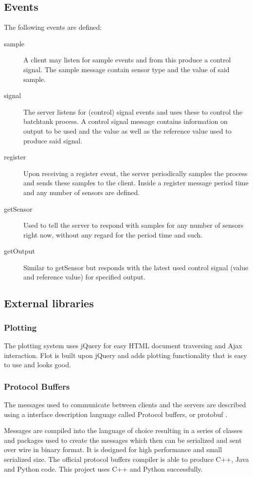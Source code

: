 \documentclass{article}
\begin{document}
\subsection{Events}
The following events are defined:

\begin{description}
\item[sample]
  A client may listen for sample events and from this produce a control
  signal. The sample message contain sensor type and the value of said
  sample.
\item[signal]
  The server listens for (control) signal events and uses these to
  control the batchtank process. A control signal message contains
  information on output to be used and the value as well as the
  reference value used to produce said signal.
\item[register]
  Upon receiving a register event, the server periodically samples the
  process and sends these samples to the client. Inside a register
  message period time and any number of sensors are defined.
\item[getSensor]
  Used to tell the server to respond with samples for any number of
  sensors right now, without any regard for the period time and such.
\item[getOutput]
  Similar to getSensor but responds with the latest used control signal
  (value and reference value) for specified output.
\end{description}

\subsection{External libraries}
\subsubsection{Plotting}
The plotting system uses jQuery \cite{jquery} for easy HTML document
traversing and Ajax interaction. Flot \cite{flot} is built upon jQuery
and adds plotting functionality that is easy to use and looks good.


\subsubsection{Protocol Buffers}
The messages used to communicate between clients and the servers are
described using a interface description language called Protocol
buffers, or protobuf \cite{protobuf}.

Messages are compiled into the language of choice resulting in a series
of classes and packages used to create the messages which then can be
serialized and sent over wire in binary format. It is designed for high
performance and small serialized size. The official protocol buffers
compiler is able to produce C++, Java and Python code. This project uses
C++ and Python successfully.
\end{document}
